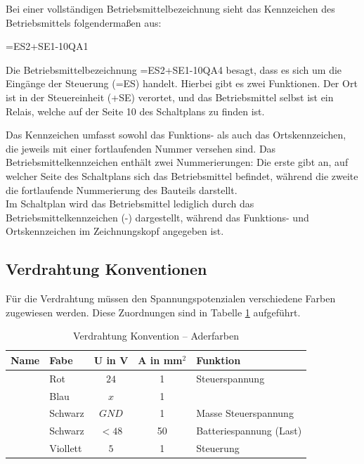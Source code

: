 Bei einer vollständigen Betriebsmittelbezeichnung sieht das Kennzeichen des Betriebsmittels folgendermaßen aus:

\begin{center} =ES2+SE1-10QA1 \end{center}

Die Betriebsmittelbezeichnung =ES2+SE1-10QA4 besagt, dass es sich um die Eingänge der Steuerung (=ES) handelt. Hierbei gibt es zwei Funktionen. Der Ort ist in der Steuereinheit (+SE) verortet, und das Betriebsmittel selbst ist ein Relais, welche auf der Seite 10 des Schaltplans zu finden ist.

Das Kennzeichen umfasst sowohl das Funktions- als auch das Ortskennzeichen, die jeweils mit einer fortlaufenden Nummer versehen sind. Das Betriebsmittelkennzeichen enthält zwei Nummerierungen: Die erste gibt an, auf welcher Seite des Schaltplans sich das Betriebsmittel befindet, während die zweite die fortlaufende Nummerierung des Bauteils darstellt.\\
Im Schaltplan wird das Betriebsmittel lediglich durch das Betriebsmittelkennzeichen (-) dargestellt, während das Funktions- und Ortskennzeichen im Zeichnungskopf angegeben ist.

\newpage

\subsection{Verdrahtung Konventionen}
\label{section:Verdrahtung_Konventionen}
Für die Verdrahtung müssen den Spannungspotenzialen verschiedene Farben zugewiesen werden. Diese Zuordnungen sind in Tabelle \ref{Verdrahtung_Konventionen:tab:Zuordnung} aufgeführt.
\pagebreak[1]
\begin{table}[!ht]
	\centering
	\caption{Verdrahtung Konvention – Aderfarben}
	\label{Verdrahtung_Konventionen:tab:Zuordnung}
	\begin{tabular}{llccl}
		\hline
		\textbf{Name} & \textbf{Fabe}                 & \textbf{U in V} & \textbf{A in mm$^2$} & \textbf{Funktion}       \\ \hline
		              & \multicolumn{1}{l|}{Rot}      & $24$            & 1                    & Steuerspannung          \\
		              & \multicolumn{1}{l|}{Blau}     & $x$             & 1                    &                         \\
		              & \multicolumn{1}{l|}{Schwarz}  & $GND$           & 1                    & Masse Steuerspannung    \\
		              & \multicolumn{1}{l|}{Schwarz}  & $< 48$          & 50                   & Batteriespannung (Last) \\
		              & \multicolumn{1}{l|}{Viollett} & $5$             & 1                    & Steuerung               \\ \hline
	\end{tabular}
\end{table}
\pagebreak[4]

